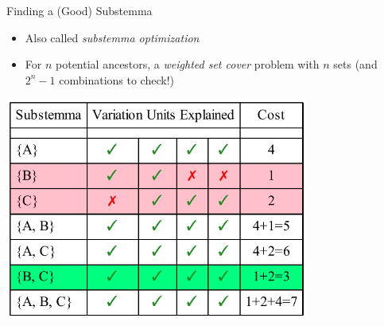 \documentclass[10pt]{beamer}
\begin{document}
	\begin{frame}{Finding a (Good) Substemma}\label{slide:substemma-search}
		\begin{itemize}
			\item Also called \emph{substemma optimization}
			\item For $n$ potential ancestors, a \emph{weighted set cover} problem with $n$ sets (and $2^n - 1$ combinations to check!)
		\end{itemize}
		\begin{center}
			\includegraphics[width=0.75\textwidth]{../graphics/weighted-set-cover.pdf}
		\end{center}
	\end{frame}
\end{document}
